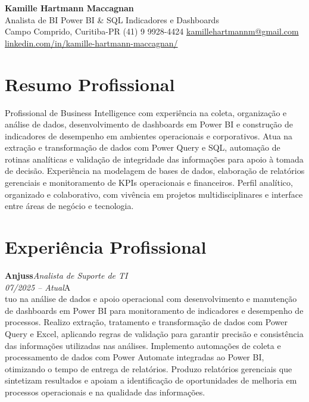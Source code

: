 \documentclass[11pt,a4paper]{article}
\newcommand{\cvrole}[4]{%
  \vspace{4pt}%
  {\bfseries\color{accentcolor}#1}\hfill{\itshape #2}\\[-2pt]%
  {\itshape #3}\hfill #4\\[6pt]%
}
\begin{document}
\begin{center}
  {\fontsize{20}{24}\selectfont\bfseries Kamille Hartmann Maccagnan}\\[8pt]
  {\large Analista de BI \textbar{} Power BI \& SQL \textbar{} Indicadores e Dashboards}\\[10pt]
  Campo Comprido, Curitiba-PR \enspace\textbullet\enspace (41) 9 9928-4424 \enspace\textbullet\enspace
  \href{mailto:kamillehartmannm@gmail.com}{kamillehartmannm@gmail.com}\\[3pt]
  \href{https://linkedin.com/in/kamille-hartmann-maccagnan/}{linkedin.com/in/kamille-hartmann-maccagnan/}
\end{center}

\vspace{6pt}

\section{Resumo Profissional}

Profissional de Business Intelligence com experiência na coleta, organização e análise de dados, desenvolvimento de dashboards em Power BI e construção de indicadores de desempenho em ambientes operacionais e corporativos. Atua na extração e transformação de dados com Power Query e SQL, automação de rotinas analíticas e validação de integridade das informações para apoio à tomada de decisão. Experiência na modelagem de bases de dados, elaboração de relatórios gerenciais e monitoramento de KPIs operacionais e financeiros. Perfil analítico, organizado e colaborativo, com vivência em projetos multidisciplinares e interface entre áreas de negócio e tecnologia.

\section{Experiência Profissional}

\cvrole{Anjuss}{Analista de Suporte de TI}{07/2025 -- Atual}

Atuo na análise de dados e apoio operacional com desenvolvimento e manutenção de dashboards em Power BI para monitoramento de indicadores e desempenho de processos. Realizo extração, tratamento e transformação de dados com Power Query e Excel, aplicando regras de validação para garantir precisão e consistência das informações utilizadas nas análises. Implemento automações de coleta e processamento de dados com Power Automate integradas ao Power BI, otimizando o tempo de entrega de relatórios. Produzo relatórios gerenciais que sintetizam resultados e apoiam a identificação de oportunidades de melhoria em processos operacionais e na qualidade das informações.
\end{document}
